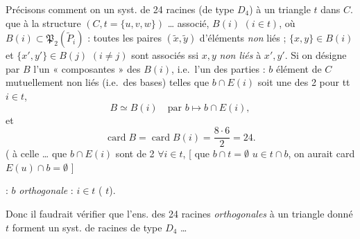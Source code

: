 \documentclass[11pt,a4paper]{article}
\begin{document}
Précisons comment on \ill{} \ill{} un syst. de 24 racines (de type $D_4$)
à un triangle $t$ dans $C$. \ill{} \ill{} que à la structure
$(C, t = \lbrace u, v, w \rbrace)$ \ldots{} associé, \struck{\ill{} \ill{}}
$B(i)$ $(i \in t)$, où $B(i) \subset \mathfrak{P}_2(\widetilde{P}_i)$ :
toutes les \struck{\ill{}} paires $(\tilde{x}, \tilde{y})$ d'éléments
\emph{non} liés ; $\lbrace x, y \rbrace \in B(i)$ et
$\lbrace x', y' \rbrace \in B(j)$ $(i \neq j)$ sont associés ssi
\struck{\ill{}} $x, y$ \emph{non liés} à $x', y'$.  Si on
désigne par $B$ l'un  « composantes » des $B(i)$, i.e.\ l'un des
parties  : $b$ élément de $C$ mutuellement non liés (i.e.\ des
bases) telles que $b \cap E(i)$  soit une des
 2 pour tt $i \in t$, 
\[
B \simeq B(i) \quad \text{par } b \mapsto b \cap E(i),
\]
et
\[
\operatorname{card} B = \operatorname{card} B(i) = \frac{8 \cdot 6}{2} = 24 .
\]
(  
 à celle \ldots{} que $b \cap E(i)$ sont de
 2 $\forall i \in t$, [\ill{} \struck{\ill{} \ill{}}
\add{\ill{}}  que $b \cap t = \emptyset$ \struck{\ill{}}
 
\ill{} $u \in t \cap b$, on aurait card $E(u) \cap b = \emptyset$ ]

\ill{} : \ill{} $b$ \emph{orthogonale} : \ill{} $i \in t$ \ill{} \ill{}
(\ill{} $t$).



Donc il faudrait vérifier que l'ens. des 24 racines \emph{orthogonales} à
un triangle donné $t$ forment un syst. de racines de type $D_4$ \ldots

\end{document}
